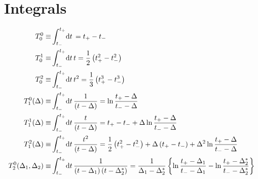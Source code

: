 \documentclass[english,notitlepage]{article}
\begin{document}
\section{Integrals}
    \begin{subequations}
        \begin{align}
            T^0_0 \equiv                     & \int_{t_-}^{t_+} \!\mathrm{d}t\, = t_+ - t_-                                                                                                                                                                                                         \\
            T^1_0 \equiv                     & \int_{t_-}^{t_+} \!\mathrm{d}t\, t = \frac{1}{2} \pclosed{t_+^2 - t_-^2}                                                                                                                                                                             \\
            T^2_0 \equiv                     & \int_{t_-}^{t_+} \!\mathrm{d}t\, t^2 = \frac{1}{3} \pclosed{t_+^3 - t_-^3}                                                                                                                                                                           \\
            T_1^0(\Delta) \equiv             & \int_{t_-}^{t_+} \!\mathrm{d}t\, \frac{1}{\pclosed{t-\Delta}} = \ln\frac{t_+ - \Delta}{t_- - \Delta}                                                                                                                                                 \\
            T_1^1(\Delta) \equiv             & \int_{t_-}^{t_+} \!\mathrm{d}t\, \frac{t}{\pclosed{t-\Delta}} = t_+ - t_- + \Delta \ln\frac{t_+ - \Delta}{t_- - \Delta}                                                                                                                              \\
            T_1^2(\Delta) \equiv             & \int_{t_-}^{t_+} \!\mathrm{d}t\, \frac{t^2}{\pclosed{t-\Delta}} = \frac{1}{2}\pclosed{t_+^2 - t_-^2} + \Delta \pclosed{t_+ - t_-} + \Delta^2 \ln\frac{t_+ - \Delta}{t_- - \Delta}                                                                    \\
            T_2^0(\Delta_1, \Delta_2) \equiv & \int_{t_-}^{t_+} \!\mathrm{d}t\, \frac{1}{\pclosed{t-\Delta_1}\pclosed{t-\Delta_2^\ast}} = \frac{1}{\Delta_1 - \Delta_2^\ast} \cclosed{\ln\frac{t_+-\Delta_1}{t_--\Delta_1} - \ln\frac{t_+-\Delta_2^\ast}{t_--\Delta_2^\ast}}                        \\

\end{align}
\end{subequations}
\end{document}
